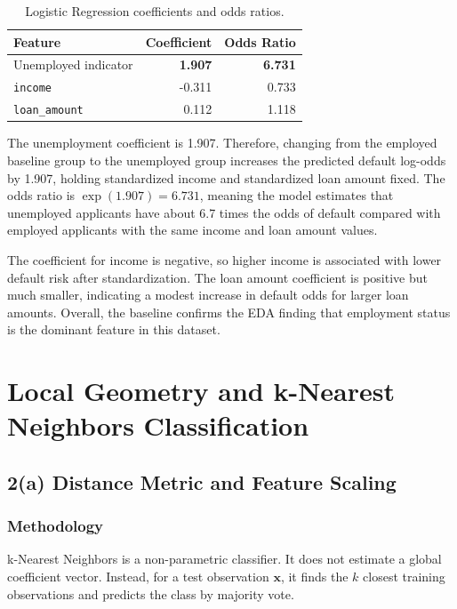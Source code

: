 \documentclass[12pt]{article}
\newcommand{\best}[1]{\textbf{#1}}
\begin{document}
\begin{table}[htbp]
\centering
\caption{Logistic Regression coefficients and odds ratios.}
\begin{tabular}{lrr}
\toprule
Feature & Coefficient & Odds Ratio \\
\midrule
Unemployed indicator & \best{1.907} & \best{6.731} \\
\texttt{income} & -0.311 & 0.733 \\
\texttt{loan\_amount} & 0.112 & 1.118 \\
\bottomrule
\end{tabular}
\end{table}

The unemployment coefficient is 1.907. Therefore, changing from the employed baseline group to the unemployed group increases the predicted default log-odds by 1.907, holding standardized income and standardized loan amount fixed. The odds ratio is $\exp(1.907)=6.731$, meaning the model estimates that unemployed applicants have about 6.7 times the odds of default compared with employed applicants with the same income and loan amount values.

The coefficient for income is negative, so higher income is associated with lower default risk after standardization. The loan amount coefficient is positive but much smaller, indicating a modest increase in default odds for larger loan amounts. Overall, the baseline confirms the EDA finding that employment status is the dominant feature in this dataset.

\section{Local Geometry and k-Nearest Neighbors Classification}

\subsection{2(a) Distance Metric and Feature Scaling}

\subsubsection{Methodology}

k-Nearest Neighbors is a non-parametric classifier. It does not estimate a global coefficient vector. Instead, for a test observation $\mathbf{x}$, it finds the $k$ closest training observations and predicts the class by majority vote.
\end{document}
